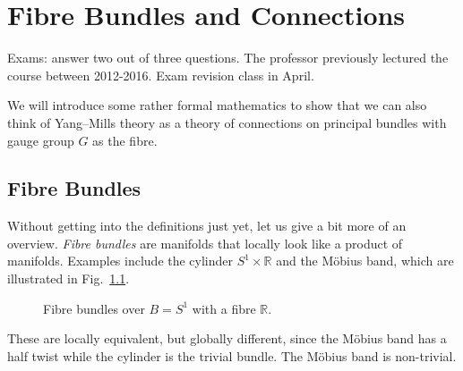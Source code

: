 
\chapter{Fibre Bundles and Connections}%
\label{cha:fibre_bundles_and_connections}

\begin{leftbar}
  Exams: answer two out of three questions. The professor previously lectured the course between 2012-2016.
  Exam revision class in April.
\end{leftbar}

We will introduce some rather formal mathematics to show that we can also think of Yang--Mills theory as a theory of connections on principal bundles with gauge group $G$ as the fibre.

\section{Fibre Bundles}%
\label{sec:fibre_bundles}

Without getting into the definitions just yet, let us give a bit more of an overview.
\emph{Fibre bundles} are manifolds that locally look like a product of manifolds.
Examples include the cylinder $S^1 \times \mathbb{R}$ and the Möbius band, which are illustrated in Fig.~\ref{fig:fibre-bundles}.
\begin{figure}[tbhp]
  \centering
  \caption{Fibre bundles over $B = S^1$ with a fibre $\mathbb{R}$.}
  \label{fig:fibre-bundles}
\end{figure}
These are locally equivalent, but globally different, since the Möbius band has a half twist while the cylinder is the trivial bundle. The Möbius band is non-trivial. 

